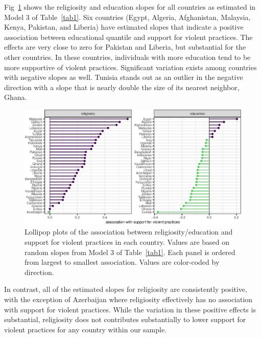 \documentclass[10pt,letterpaper]{article}
\begin{document}
Fig~\ref{fig3} shows the religiosity and education slopes for all countries as estimated in Model 3 of Table~\ref{tab1}. Six countries (Egypt, Algeria, Afghanistan, Malaysia, Kenya, Pakistan, and Liberia) have estimated slopes that indicate a positive association between educational quantile and support for violent practices. The effects are very close to zero for Pakistan and Liberia, but substantial for the other countries. In these countries, individuals with more education tend to be more supportive of violent practices. Significant variation exists among countries with negative slopes as well. Tunisia stands out as an outlier in the negative direction with a slope that is nearly double the size of its nearest neighbor, Ghana.

\begin{figure}[!h]
\begin{adjustwidth}{-2.25in}{0in}
\centering
\includegraphics{figures/fig3.eps}
\caption{Lollipop plots of the association between religiosity/education
and support for violent practices in each country. Values are based on
random slopes from Model 3 of Table~\ref{tab1}. Each panel is ordered from
largest to smallest association. Values are color-coded by direction.}
\label{fig3}
\end{adjustwidth}
\end{figure}

In contrast, all of the estimated slopes for religiosity are
consistently positive, with the exception of Azerbaijan where
religiosity effectively has no association with support for violent
practices. While the variation in these positive effects is substantial,
religiosity does not contributes substantially to lower support for
violent practices for any country within our sample.
\end{document}
